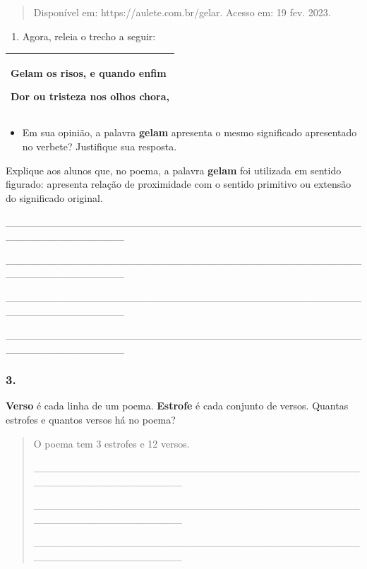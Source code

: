 \begin{quote}
Disponível em: https://aulete.com.br/gelar. Acesso em: 19 fev. 2023.
\end{quote}

\begin{enumerate}
\def\labelenumi{\alph{enumi})}
\item
  Agora, releia o trecho a seguir:
\end{enumerate}

\begin{longtable}[]{@{}l@{}}
\toprule
\begin{minipage}[t]{0.97\columnwidth}\raggedright\strut
Gelam os risos, e quando enfim

Dor ou tristeza nos olhos chora,\strut
\end{minipage}\tabularnewline
\bottomrule
\end{longtable}

\begin{itemize}
\item
  Em sua opinião, a palavra \textbf{gelam} apresenta o mesmo significado
  apresentado no verbete? Justifique sua resposta.
\end{itemize}

Explique aos alunos que, no poema, a palavra \textbf{gelam} foi
utilizada em sentido figurado: apresenta relação de proximidade com o
sentido primitivo ou extensão do significado original.

\_\_\_\_\_\_\_\_\_\_\_\_\_\_\_\_\_\_\_\_\_\_\_\_\_\_\_\_\_\_\_\_\_\_\_\_\_\_\_\_\_\_\_\_\_\_\_\_\_\_\_\_\_\_\_\_\_\_\_\_\_\_\_\_

\_\_\_\_\_\_\_\_\_\_\_\_\_\_\_\_\_\_\_\_\_\_\_\_\_\_\_\_\_\_\_\_\_\_\_\_\_\_\_\_\_\_\_\_\_\_\_\_\_\_\_\_\_\_\_\_\_\_\_\_\_\_\_\_

\_\_\_\_\_\_\_\_\_\_\_\_\_\_\_\_\_\_\_\_\_\_\_\_\_\_\_\_\_\_\_\_\_\_\_\_\_\_\_\_\_\_\_\_\_\_\_\_\_\_\_\_\_\_\_\_\_\_\_\_\_\_\_\_

\_\_\_\_\_\_\_\_\_\_\_\_\_\_\_\_\_\_\_\_\_\_\_\_\_\_\_\_\_\_\_\_\_\_\_\_\_\_\_\_\_\_\_\_\_\_\_\_\_\_\_\_\_\_\_\_\_\_\_\_\_\_\_\_

\subsubsection{3. }\label{section-49}

\textbf{Verso} é cada linha de um poema. \textbf{Estrofe} é cada
conjunto de versos. Quantas estrofes e quantos versos há no poema?

\begin{quote}
O poema tem 3 estrofes e 12 versos.

\_\_\_\_\_\_\_\_\_\_\_\_\_\_\_\_\_\_\_\_\_\_\_\_\_\_\_\_\_\_\_\_\_\_\_\_\_\_\_\_\_\_\_\_\_\_\_\_\_\_\_\_\_\_\_\_\_\_\_\_\_\_\_\_

\_\_\_\_\_\_\_\_\_\_\_\_\_\_\_\_\_\_\_\_\_\_\_\_\_\_\_\_\_\_\_\_\_\_\_\_\_\_\_\_\_\_\_\_\_\_\_\_\_\_\_\_\_\_\_\_\_\_\_\_\_\_\_\_

\_\_\_\_\_\_\_\_\_\_\_\_\_\_\_\_\_\_\_\_\_\_\_\_\_\_\_\_\_\_\_\_\_\_\_\_\_\_\_\_\_\_\_\_\_\_\_\_\_\_\_\_\_\_\_\_\_\_\_\_\_\_\_\_
\end{quote}

